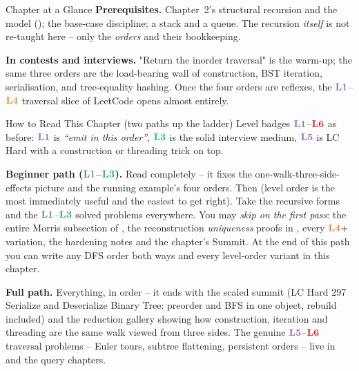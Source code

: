 \begin{chaptertheorybox}{Chapter at a Glance}
\textbf{Prerequisites.} Chapter~2's structural recursion and the 
model (); the base-case discipline; a stack and a queue. The
recursion \emph{itself} is not re-taught here -- only the \emph{orders} and their
bookkeeping.

\textbf{In contests and interviews.} "Return the inorder traversal" is the warm-up;
the same three orders are the load-bearing wall of construction, BST iteration,
serialisation, and tree-equality hashing. Once the four orders are reflexes, the
$\lv1$--$\lv4$ traversal slice of LeetCode opens almost entirely.
\end{chaptertheorybox}

\begin{chaptertheorybox}{How to Read This Chapter (two paths up the ladder)}
Level badges $\lv1$--$\lv6$ as before: $\lv1$ is \emph{``emit in this order''},
$\lv3$ is the solid interview medium, $\lv5$ is LC Hard with a construction or
threading trick on top.

\textbf{Beginner path ($\lv1$--$\lv3$).} Read  completely -- it fixes
the one-walk-three-side-effects picture and the running example's four orders. Then
 (level order is the most immediately useful and the easiest to get
right). Take the recursive forms and the $\lv1$--$\lv3$ solved problems everywhere.
You may \emph{skip on the first pass}: the entire Morris subsection of
, the reconstruction \emph{uniqueness} proofs in
, every $\lv4{+}$ variation, the hardening notes and the
chapter's Summit. At the end of this path you can write any DFS order both ways and
every level-order variant in this chapter.

\textbf{Full path.} Everything, in order -- it ends with the scaled summit
(LC Hard 297 Serialize and Deserialize Binary Tree: preorder and BFS in one object,
rebuild included) and the reduction gallery showing how construction, iteration and
threading are the same walk viewed from three sides. The genuine $\lv5$--$\lv6$
traversal problems -- Euler tours, subtree flattening, persistent orders -- live in
 and the query chapters.
\end{chaptertheorybox}

